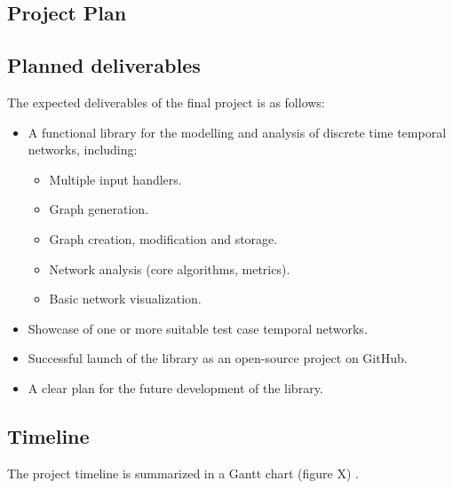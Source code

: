 \begin{plan}
\section{Project Plan}
\subsection{Planned deliverables}
The expected deliverables of the final project is as follows:
\begin{itemize}
  \item A functional library for the modelling and analysis of discrete time temporal networks, including:
  \begin{itemize}
      \item Multiple input handlers.
      \item Graph generation.
      \item Graph creation, modification and storage.
      \item Network analysis (core algorithms, metrics).
      \item Basic network visualization.
  \end{itemize}
  \item Showcase of one or more suitable test case temporal networks.
  \item Successful launch of the library as an open-source project on GitHub.
  \item A clear plan for the future development of the library.
\end{itemize}
\subsection{Timeline}
The project timeline is summarized in a Gantt chart (figure X) \cite{gantt}.
\end{plan}
\vspace{1cm}
\clearpage